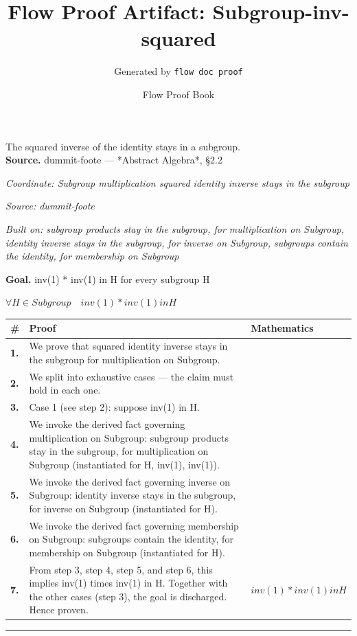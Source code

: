 \documentclass[11pt]{article}
\title{Flow Proof Artifact: Subgroup-inv-squared}
\author{Generated by \texttt{flow doc proof}}
\date{Flow Proof Book}
\theoremstyle{definition}
\begin{document}
\maketitle
The squared inverse of the identity stays in a subgroup.\\[0.5em]
\textbf{Source.} dummit-foote — *Abstract Algebra*, §2.2\\[0.5em]
\bigskip
{}\par
\smallskip\noindent\textit{Coordinate: Subgroup \cdot multiplication \cdot squared identity inverse stays in the subgroup}\par
\smallskip\noindent\textit{Source: dummit-foote}\par
\smallskip\noindent\textit{Built on: subgroup products stay in the subgroup, for multiplication on Subgroup, identity inverse stays in the subgroup, for inverse on Subgroup, subgroups contain the identity, for membership on Subgroup}\par
\medskip
\noindent\textbf{Goal.} inv(1) * inv(1) in H for every subgroup H\par
\noindent$\displaystyle \forall H \in Subgroup\quad inv(1) * inv(1) in H$\par
\medskip
\noindent
\begin{tabular}{@{} >{\raggedright\arraybackslash}p{} >{\raggedright\arraybackslash}p{} >{\raggedleft\arraybackslash}p{} @{}}
\textbf{\#} & \textbf{Proof} & \textbf{Mathematics} \\
\midrule
\textbf{1.} & We prove that squared identity inverse stays in the subgroup for multiplication on Subgroup. & \\[0.45em]
\textbf{2.} & We split into exhaustive cases — the claim must hold in each one. & \\[0.45em]
\textbf{3.} & Case 1 (see step 2): suppose inv(1) in H. & \\[0.45em]
\textbf{4.} & We invoke the derived fact governing multiplication on Subgroup: subgroup products stay in the subgroup, for multiplication on Subgroup (instantiated for H, inv(1), inv(1)). & \\[0.45em]
\textbf{5.} & We invoke the derived fact governing inverse on Subgroup: identity inverse stays in the subgroup, for inverse on Subgroup (instantiated for H). & \\[0.45em]
\textbf{6.} & We invoke the derived fact governing membership on Subgroup: subgroups contain the identity, for membership on Subgroup (instantiated for H). & \\[0.45em]
\textbf{7.} & From step 3, step 4, step 5, and step 6, this implies inv(1) times inv(1) in H. Together with the other cases (step 3), the goal is discharged. Hence proven. & $\displaystyle inv(1) * inv(1) in H$ \\[0.45em]
\bottomrule
\end{tabular}
\label{thm:Subgroup-multiplication-squared_identity_inverse_stays_in_the_subgroup}
\par\medskip\hrule
\end{document}

